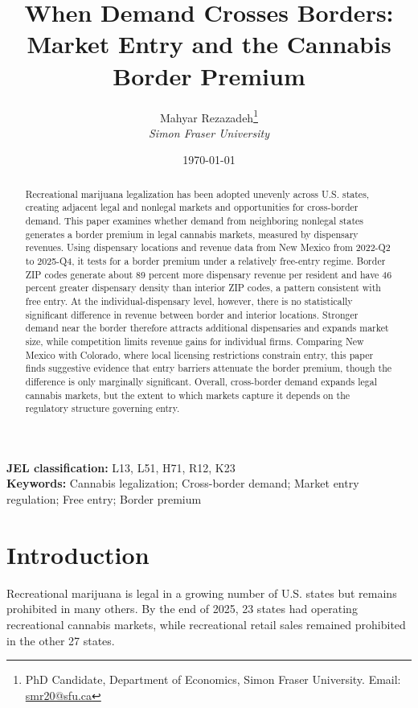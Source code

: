 \documentclass[12pt]{article}
\begin{document}
\title{When Demand Crosses Borders: Market Entry and the Cannabis Border Premium}
\author{Mahyar Rezazadeh\thanks{PhD Candidate, Department of Economics, Simon Fraser University. Email: \href{mailto:smr20@sfu.ca}{smr20@sfu.ca}}\\ {\small \emph{Simon Fraser University}}}
\date{\today}
\maketitle
\thispagestyle{empty}
\begin{abstract}
\noindent Recreational marijuana legalization has been adopted unevenly across U.S. states, creating adjacent legal and nonlegal markets and opportunities for cross-border demand. This paper examines whether demand from neighboring nonlegal states generates a border premium in legal cannabis markets, measured by dispensary revenues. Using dispensary locations and revenue data from New Mexico from 2022-Q2 to 2025-Q4, it tests for a border premium under a relatively free-entry regime. Border ZIP codes generate about 89 percent more dispensary revenue per resident and have 46 percent greater dispensary density than interior ZIP codes, a pattern consistent with free entry. At the individual-dispensary level, however, there is no statistically significant difference in revenue between border and interior locations. Stronger demand near the border therefore attracts additional dispensaries and expands market size, while competition limits revenue gains for individual firms. Comparing New Mexico with Colorado, where local licensing restrictions constrain entry, this paper finds suggestive evidence that entry barriers attenuate the border premium, though the difference is only marginally significant. Overall, cross-border demand expands legal cannabis markets, but the extent to which markets capture it depends on the regulatory structure governing entry.
\end{abstract}

\medskip
\noindent \textbf{JEL classification:} L13, L51, H71, R12, K23 \\
\noindent \textbf{Keywords:} Cannabis legalization; Cross-border demand; Market entry regulation; Free entry; Border premium
\newpage
\section{Introduction}

Recreational marijuana is legal in a growing number of U.S. states but remains prohibited in many others. By the end of 2025, 23 states had operating recreational cannabis markets, while recreational retail sales remained prohibited in the other 27 states.
\end{document}
